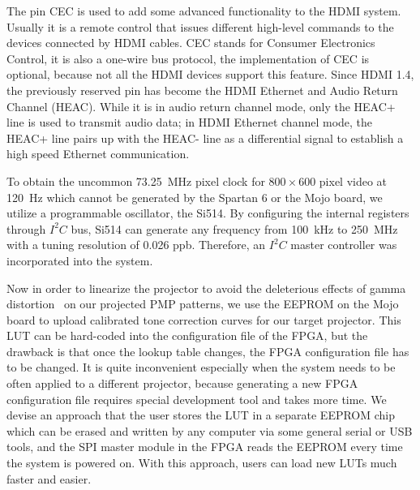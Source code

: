 \documentclass[]{spie}  %
\begin{document}
The pin CEC is used to add some advanced functionality to the HDMI system. Usually it is a remote control that issues different high-level commands to the devices connected by HDMI cables. CEC stands for Consumer Electronics Control, it is also a one-wire bus protocol, the implementation of CEC is optional, because not all the HDMI devices support this feature. Since HDMI 1.4, the previously reserved pin has become the HDMI Ethernet and Audio Return Channel (HEAC). While it is in audio return channel mode, only the HEAC+ line is used to transmit audio data; in HDMI Ethernet channel mode, the HEAC+ line pairs up with the HEAC- line as a differential signal to establish a high speed Ethernet communication.

To obtain the uncommon 73.25~MHz pixel clock for $800\times 600$ pixel video at 120~Hz which cannot be generated by the Spartan 6 or the Mojo board, we utilize a programmable oscillator, the Si514. By configuring the internal registers through $I^2C$ bus, Si514 can generate any frequency from 100~kHz to 250~MHz with a tuning resolution of 0.026 ppb. Therefore, an $I^2C$ master controller was incorporated into the system.%

Now in order to linearize the projector to avoid the deleterious effects of gamma distortion~\cite{gamm10} on our projected PMP patterns, we use the EEPROM on the Mojo board to upload calibrated tone correction curves for our target projector.
This LUT can be hard-coded into the configuration file of the FPGA, but the drawback is that once the lookup table changes, the FPGA configuration file has to be changed. It is quite inconvenient especially when the system needs to be often applied to a different projector, because generating a new FPGA configuration file requires special development tool and takes more time. We devise an approach that the user stores the LUT in a separate EEPROM chip which can be erased and written by any computer via some general serial or USB tools, and the SPI master module in the FPGA reads the EEPROM every time the system  is powered on. With this approach, users can load new LUTs much faster and easier.
\end{document}
